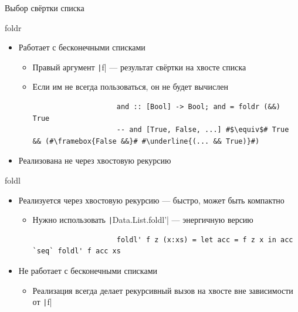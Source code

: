    \begin{frame}[fragile]{Выбор свёртки списка \practicalslide}
        \pause
        \begin{block}{foldr}
            \begin{itemize}
                \item[\positive] \pause Работает с бесконечными списками
                \begin{itemize}
                    \item Правый аргумент \texttt|f| --- результат свёртки на хвосте списка
                    \item Если им не всегда пользоваться, он не будет вычислен
                    \begin{verbatim}
                    and :: [Bool] -> Bool; and = foldr (&&) True
                    -- and [True, False, ...] #$\equiv$# True && (#\framebox{False &&}# #\underline{(... && True)}#)
                    \end{verbatim}
                \end{itemize}
                \item[\negative] Реализована не через хвостовую рекурсию
            \end{itemize}
        \end{block}
        \begin{block}{foldl}
            \begin{itemize}
                \item[\positive] Реализуется через хвостовую рекурсию --- быстро, может быть компактно
                \begin{itemize}
                    \item Нужно использовать \texttt|Data.List.foldl'| --- энергичную версию
                    \begin{verbatim}
                    foldl' f z (x:xs) = let acc = f z x in acc `seq` foldl' f acc xs
                    \end{verbatim}
                \end{itemize}
                \item[\negative] Не работает с бесконечными списками
                \begin{itemize}
                    \item Реализация всегда делает рекурсивный вызов на хвосте вне зависимости от \texttt|f|
                \end{itemize}
            \end{itemize}
        \end{block}
    \end{frame}

